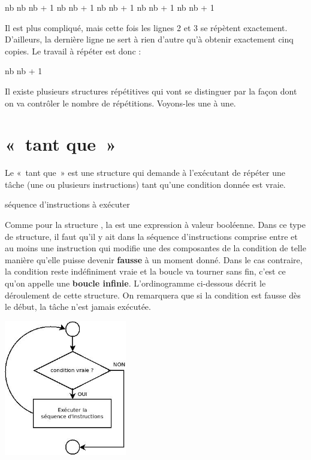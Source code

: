 		\begin{LDA}
		\Let nb 
		\Let nb \Gets nb + 1
		\Let nb \Gets nb + 1
		\Let nb \Gets nb + 1
		\Let nb \Gets nb + 1
		\Let nb \Gets nb + 1
		\end{LDA}

		Il est plus compliqué,
		mais cette fois les lignes 2 et 3 se répètent exactement.
		D'ailleurs, la dernière ligne ne sert à rien d'autre qu'à
		obtenir exactement cinq copies.
		Le travail à répéter est donc :

		\begin{LDA}
		\Write{nb}
		\Let nb \Gets nb + 1
		\end{LDA}

		Il existe plusieurs structures répétitives
		qui vont se distinguer par la façon dont on va
		contrôler le nombre de répétitions.
		Voyons-les une à une.

\section{«~tant que~»}
	
	Le «~tant que~» est une structure qui demande à
	l’exécutant de répéter une tâche (une ou plusieurs
	instructions) tant qu’une condition donnée est vraie.

	\begin{LDA}
	\While{condition}
		\Stmt séquence d’instructions à exécuter
	\EndWhile
	\end{LDA}

	Comme pour la structure , 
	la  est une expression à valeur booléenne. 
	Dans ce type de structure, 
	il faut qu’il y ait dans la séquence d’instructions comprise entre
	 et  au moins une
	instruction qui modifie une des composantes de la condition de telle
	manière qu’elle puisse devenir \textbf{fausse} à un moment donné. Dans
	le cas contraire, la condition reste indéfiniment vraie et la boucle va
	tourner sans fin, c’est ce qu’on appelle une \textbf{boucle infinie}. 
	L'ordinogramme ci-dessous décrit  le déroulement de cette structure. 
	On remarquera que si la condition est fausse dès le début, 
	la tâche n’est jamais exécutée.

	\begin{center}
	\includegraphics[width=0.4\textwidth]{image/boucle-tq}
	\label{fig:boucle-tq}
	\end{center}

